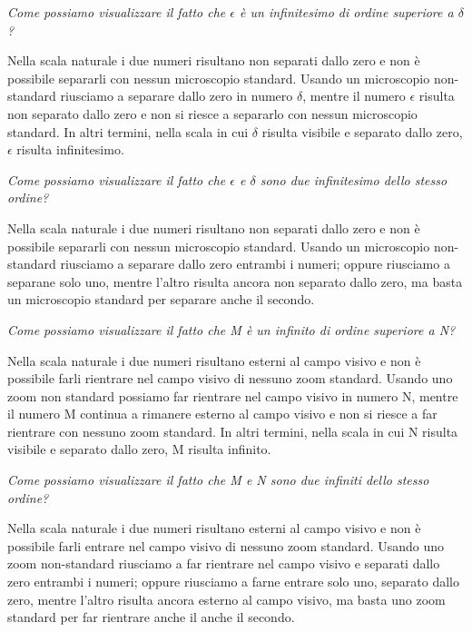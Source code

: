 \begin{esercizio}\label{ese:iper_041} 
\emph{Come possiamo visualizzare il fatto che \(\epsilon\) è un 
infinitesimo di ordine superiore a \(\delta\)?}

Nella scala naturale i due numeri risultano non separati dallo zero e non è 
possibile separarli con nessun microscopio standard. Usando un microscopio 
non-standard riusciamo a separare dallo zero in numero \(\delta\), mentre 
il numero \(\epsilon\) risulta non separato dallo zero e non si riesce a 
separarlo con nessun microscopio standard. In altri termini, nella scala in 
cui \(\delta\) risulta visibile e separato dallo zero, \(\epsilon\) risulta 
infinitesimo.
\end{esercizio}

\begin{esercizio}\label{ese:iper_042} 
\emph{Come possiamo visualizzare il fatto che \(\epsilon\) e \(\delta\) 
sono due infinitesimo dello stesso ordine?}

Nella scala naturale i due numeri risultano non separati dallo zero e non è 
possibile separarli con nessun microscopio standard. Usando un microscopio 
non-standard riusciamo a separare dallo zero entrambi i numeri; oppure 
riusciamo a separane solo uno, mentre l'altro risulta ancora non separato 
dallo zero, ma basta un microscopio standard per separare anche il secondo.
\end{esercizio}

\begin{esercizio}\label{ese:iper_043} 
\emph{Come possiamo visualizzare il fatto che M è un infinito di ordine 
superiore a N?}

Nella scala naturale i due numeri risultano esterni al campo visivo e non è 
possibile farli rientrare nel campo visivo di nessuno zoom standard. Usando 
uno zoom non standard possiamo far rientrare nel campo visivo in numero N, 
mentre il numero M continua a rimanere esterno al campo visivo e non si 
riesce a far rientrare con nessuno zoom standard. In altri termini, nella 
scala in cui N risulta visibile e separato dallo zero, M risulta infinito.
\end{esercizio}

\begin{esercizio}\label{ese:iper_044} 
\emph{Come possiamo visualizzare il fatto che M e N sono due infiniti dello 
stesso ordine?}

Nella scala naturale i due numeri risultano esterni al campo visivo e non è 
possibile farli entrare nel campo visivo di nessuno zoom standard. Usando 
uno zoom non-standard riusciamo a far rientrare nel campo visivo e separati 
dallo zero entrambi i numeri; oppure riusciamo a farne entrare solo uno, 
separato dallo zero, mentre l'altro risulta ancora esterno al campo visivo, 
ma basta uno zoom standard per far rientrare anche il anche il secondo.
\end{esercizio}

